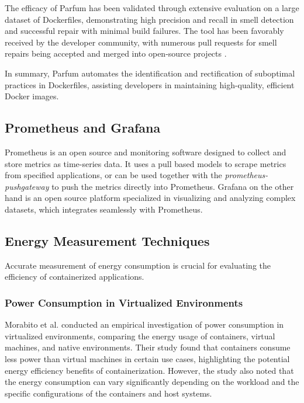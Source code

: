 \documentclass[conference]{IEEEtran}
\begin{document}
The efficacy of Parfum has been validated through extensive evaluation on a large dataset of Dockerfiles, demonstrating high precision and recall in smell detection and successful repair with minimal build failures. The tool has been favorably received by the developer community, with numerous pull requests for smell repairs being accepted and merged into open-source projects \cite{durieux2023parfumdetectionautomaticrepair}.

In summary, Parfum automates the identification and rectification of suboptimal practices in Dockerfiles, assisting developers in maintaining high-quality, efficient Docker images.

\subsection{Prometheus and Grafana}
Prometheus is an open source and monitoring software designed to collect and store metrics as time-series data. It uses a pull based models to scrape metrics from specified applications, or can be used together with the \textit{prometheus-pushgateway} to push the metrics directly into Prometheus. Grafana on the other hand is an open source platform specialized in visualizing and analyzing complex datasets, which integrates seamlessly with Prometheus.

\subsection{Energy Measurement Techniques}

Accurate measurement of energy consumption is crucial for evaluating the efficiency of containerized applications. 

\subsubsection{Power Consumption in Virtualized Environments}
Morabito et al. \cite{morabito2017power} conducted an empirical investigation of power consumption in virtualized environments, comparing the energy usage of containers, virtual machines, and native environments. Their study found that containers consume less power than virtual machines in certain use cases, highlighting the potential energy efficiency benefits of containerization. However, the study also noted that the energy consumption can vary significantly depending on the workload and the specific configurations of the containers and host systems.
\end{document}
